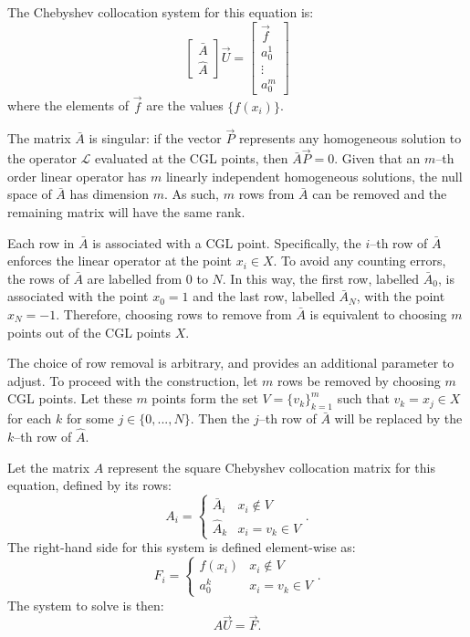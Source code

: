 \documentclass{article}
\begin{document}
The Chebyshev collocation system for this equation is:
\begin{equation}
\begin{bmatrix} \bar{A} \\ \hat{A} \end{bmatrix} \vec{U} =
\begin{bmatrix} \vec{f} \\ a_0^1 \\ \vdots \\ a_0^m \end{bmatrix}
\end{equation}
where the elements of $\vec{f}$ are the values $\{ f(x_i) \}$.

The matrix $\bar{A}$ is singular: if the vector $\vec{P}$ represents any homogeneous solution to the operator $\mathcal{L}$ evaluated at the CGL points, then $\bar{A} \vec{P} = 0$.
Given that an $m$--th order linear operator has $m$ linearly independent homogeneous solutions, the null space of $\bar{A}$ has dimension $m$.
As such, $m$ rows from $\bar{A}$ can be removed and the remaining matrix will have the same rank.

Each row in $\bar{A}$ is associated with a CGL point.
Specifically, the $i$--th row of $\bar{A}$ enforces the linear operator at the point $x_i \in X$.
To avoid any counting errors, the rows of $\bar{A}$ are labelled from 0 to $N$.
In this way, the first row, labelled $\bar{A}_0$, is associated with the point $x_0 = 1$ and the last row, labelled $\bar{A}_N$, with the point $x_N = -1$.
Therefore, choosing rows to remove from $\bar{A}$ is equivalent to choosing $m$ points out of the CGL points $X$.

The choice of row removal is arbitrary, and provides an additional parameter to adjust.
To proceed with the construction, let $m$ rows be removed by choosing $m$ CGL points.
Let these $m$ points form the set $V = \{ v_k \}_{k=1}^m$ such that $v_k = x_j \in X$ for each $k$ for some $j \in \{0, ..., N \}$.
Then the $j$--th row of $\bar{A}$ will be replaced by the $k$--th row of $\hat{A}$.

Let the matrix $A$ represent the square Chebyshev collocation matrix for this equation, defined by its rows:
\begin{equation}
A_i = \begin{cases} \bar{A}_i & x_i \notin V \\ \hat{A}_k & x_i = v_k \in V \end{cases}.
\end{equation}
The right-hand side for this system is defined element-wise as:
\begin{equation}
F_i = \begin{cases} f(x_i) & x_i \notin V \\ a_0^k & x_i = v_k \in V \end{cases}.
\end{equation}
The system to solve is then:
\begin{equation} \label{eq:sys1}
A \vec{U} = \vec{F}.
\end{equation}
\end{document}
